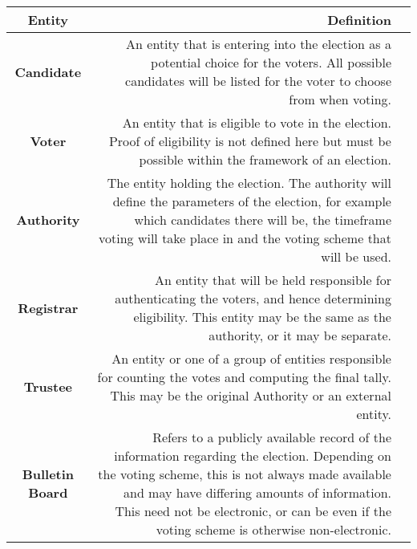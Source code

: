 \begin{table}[H]
    \centering
    \begin{tabular}{|Sr|S{p{0.666\textwidth}}|}
        \hline
        \textbf{Entity}         & \textbf{Definition}                                                                                                                                                                                                                                                                             \\
        \hline\hline
        \textbf{Candidate}      & An entity that is entering into the election as a potential choice for the voters. All possible candidates will be listed for the voter to choose from when voting.                                                                                                                             \\
        \hline
        \textbf{Voter}          & An entity that is eligible to vote in the election. Proof of eligibility is not defined here but must be possible within the framework of an election.                                                                                                                                          \\
        \hline
        \textbf{Authority}      & The entity holding the election. The authority will define the parameters of the election, for example which candidates there will be, the timeframe voting will take place in and the voting scheme that will be used.                                                                         \\
        \hline
        \textbf{Registrar}      & An entity that will be held responsible for authenticating the voters, and hence determining eligibility. This entity may be the same as the authority, or it may be separate.                                                                                                                  \\
        \hline
        \textbf{Trustee}        & An entity or one of a group of entities responsible for counting the votes and computing the final tally. This may be the original Authority or an external entity.                                                                                                                             \\

        \hline
        \textbf{Bulletin Board} & Refers to a publicly available record of the information regarding the election. Depending on the voting scheme, this is not always made available and may have differing amounts of information. This need not be electronic, or can be even if the voting scheme is otherwise non-electronic. \\


\end{tabular}
\end{table}
